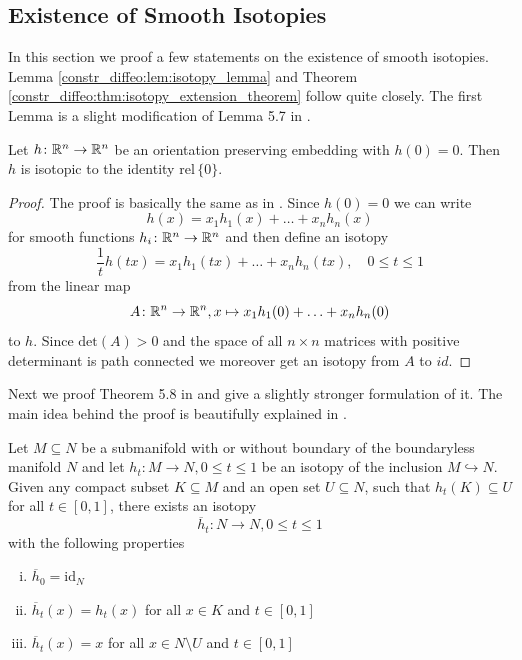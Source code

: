 \subsection{Existence of Smooth Isotopies}

In this section we proof a few statements on the existence of smooth isotopies. Lemma \ref{constr_diffeo:lem:isotopy_lemma} and Theorem \ref{constr_diffeo:thm:isotopy_extension_theorem} follow \cite{Milnor1965hcobord} quite closely. The first Lemma is a slight modification of Lemma 5.7 in \cite{Milnor1965hcobord}.

\begin{lemma}
    \label{constr_diffeo:lem:isotopy_lemma}
    Let $h \colon \mathbb{R}^n \to \mathbb{R}^n$ be an orientation preserving embedding with $h(0) = 0$. Then $h$ is isotopic to the identity $\mathrm{rel}\, \{0\}$.
\end{lemma}
\begin{proof}
    The proof is basically the same as in \cite{Milnor1965hcobord}. Since $h(0) = 0$ we can write 
    \[
    h(x) = x_1h_1(x) + \ldots + x_nh_n(x)
    \] 
    for smooth functions $h_i \colon \mathbb{R}^n \to \mathbb{R}^n$ and then define an isotopy 
    \[
    \frac{1}{t}h(tx) = x_1h_1(tx) + \ldots + x_nh_n(tx), \quad 0\leq t\leq1
    \]
    from the linear map
    \[
        A \colon \mathbb{R}^n \to \mathbb{R}^n, x \mapsto x_1h_1(0) + \ldots + x_nh_n(0)
    \]
    to $h$. Since $\mathrm{det}(A) >0$ and the space of all $n \times n$ matrices with positive determinant is path connected we moreover get an isotopy from $A$ to $id$.
\end{proof}

\noindent Next we proof Theorem 5.8 in \cite{Milnor1965hcobord} and give a slightly stronger formulation of it. The main idea behind the proof is beautifully explained in \cite{Milnor1965hcobord}.

\begin{theorem}
    \label{constr_diffeo:thm:isotopy_extension_theorem}
    Let $M \subseteq N$ be a submanifold with or without boundary of the boundaryless manifold $N$ and let $h_t \colon M \to N, 0\leq t \leq 1$ be an isotopy of the inclusion $M \hookrightarrow N$. Given any compact subset $K \subseteq M$ and an open set $U \subseteq N$, such that $h_t(K) \subseteq U$ for all $t \in [0,1]$, there exists an isotopy 
    \[
    \overline{h}_t \colon N \to N, 0\leq t\leq1
    \]
    with the following properties
    \begin{enumerate}[i)]
        \item $\overline{h}_0 = \mathrm{id}_N$
        \item $\overline{h}_t(x) = h_t(x)$ for all $x \in K$ and $t \in [0,1]$
        \item $\overline{h}_t(x) = x$ for all $x \in N\setminus U$ and $t \in [0,1]$
    \end{enumerate}
\end{theorem}

